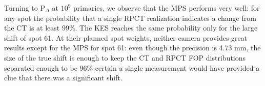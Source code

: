 \documentclass[a4paper,english]{article}
\begin{document}
Turning to P$_\Delta$ at $10^9$ primaries, we observe that the MPS performs very well: for any spot the probability that a single RPCT realization indicates a change from the CT is at least 99\%. The KES reaches the same probability only for the large shift of spot 61. At their planned spot weights, neither camera provides great results except for the MPS for spot 61: even though the precision is 4.73 mm, the size of the true shift is enough to keep the CT and RPCT FOP distributions separated enough to be 96\% certain a single measurement would have provided a clue that there was a significant shift. 





\end{document}
